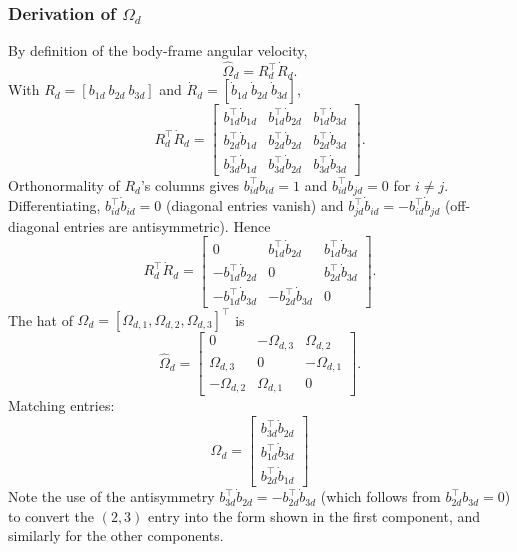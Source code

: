 \documentclass[11pt]{article}
\theoremstyle{remark}
\newcommand{\hatmap}[1]{\widehat{#1}}
\begin{document}
\subsubsection{Derivation of $\Omega_d$}
By definition of the body-frame angular velocity,
\begin{equation}
\hatmap{\Omega}_d = R_d^\top \dot R_d.
\label{eq:omega-d-def}
\end{equation}
With $R_d = [b_{1d}\ b_{2d}\ b_{3d}]$ and $\dot R_d = [\dot b_{1d}\ \dot b_{2d}\ \dot b_{3d}]$,
\[
R_d^\top\dot R_d =
\begin{bmatrix}
b_{1d}^\top\dot b_{1d} & b_{1d}^\top\dot b_{2d} & b_{1d}^\top\dot b_{3d}\\
b_{2d}^\top\dot b_{1d} & b_{2d}^\top\dot b_{2d} & b_{2d}^\top\dot b_{3d}\\
b_{3d}^\top\dot b_{1d} & b_{3d}^\top\dot b_{2d} & b_{3d}^\top\dot b_{3d}
\end{bmatrix}.
\]
Orthonormality of $R_d$'s columns gives $b_{id}^\top b_{id} = 1$ and $b_{id}^\top b_{jd} = 0$ for $i\neq j$. Differentiating, $b_{id}^\top\dot b_{id} = 0$ (diagonal entries vanish) and $b_{jd}^\top\dot b_{id} = -b_{id}^\top\dot b_{jd}$ (off-diagonal entries are antisymmetric). Hence
\[
R_d^\top\dot R_d =
\begin{bmatrix}
0 & b_{1d}^\top\dot b_{2d} & b_{1d}^\top\dot b_{3d}\\
-b_{1d}^\top\dot b_{2d} & 0 & b_{2d}^\top\dot b_{3d}\\
-b_{1d}^\top\dot b_{3d} & -b_{2d}^\top\dot b_{3d} & 0
\end{bmatrix}.
\]
The hat of $\Omega_d = [\Omega_{d,1},\Omega_{d,2},\Omega_{d,3}]^\top$ is
\[
\hatmap{\Omega}_d =
\begin{bmatrix}
0 & -\Omega_{d,3} & \Omega_{d,2}\\
\Omega_{d,3} & 0 & -\Omega_{d,1}\\
-\Omega_{d,2} & \Omega_{d,1} & 0
\end{bmatrix}.
\]
Matching entries:
\begin{equation}
\boxed{\quad\Omega_d =
\begin{bmatrix}
b_{3d}^\top\dot b_{2d}\\
b_{1d}^\top\dot b_{3d}\\
b_{2d}^\top\dot b_{1d}
\end{bmatrix}\quad}
\label{eq:omega-d-final}
\end{equation}
Note the use of the antisymmetry $b_{3d}^\top\dot b_{2d} = -b_{2d}^\top\dot b_{3d}$ (which follows from $b_{2d}^\top b_{3d} = 0$) to convert the $(2,3)$ entry into the form shown in the first component, and similarly for the other components.
\end{document}
